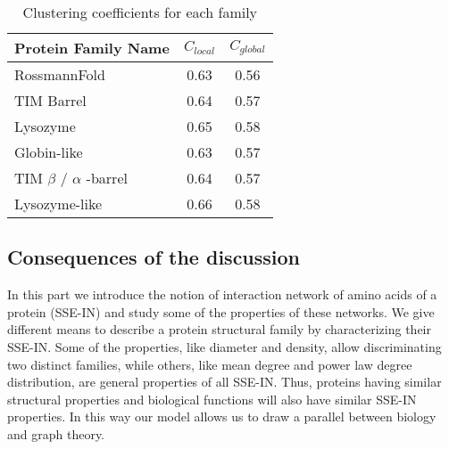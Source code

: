\begin{table}
\centering
\begin {tabular}{ | l | c | c |}
\hline
Protein Family Name & $C_{local}$ & $C_{global}$ \\ \hline
RossmannFold & 0.63 & 0.56 \\ \hline
TIM Barrel & 0.64 & 0.57 \\ \hline
Lysozyme & 0.65 & 0.58 \\ \hline
\hline
Globin-like & 0.63 & 0.57 \\ \hline
TIM $\beta$ / $\alpha$ -barrel & 0.64 & 0.57 \\ \hline
Lysozyme-like & 0.66 & 0.58 \\ \hline
\end {tabular}
\caption {Clustering coefficients for each family}
\label {tab:clustering_coefficient}
\end{table}

\subsection{Consequences of the discussion}
In this part we introduce the notion of interaction network of amino acids of a protein (SSE-IN) and study some of the properties of these networks. We give different means to describe a protein structural family by characterizing their SSE-IN. Some of the properties, like diameter and density, allow discriminating two distinct families, while others, like mean degree and power law degree distribution, are general properties of all SSE-IN. Thus, proteins having similar structural properties and biological functions will also have similar SSE-IN properties. In this way our model allows us to draw a parallel between biology and graph theory.

